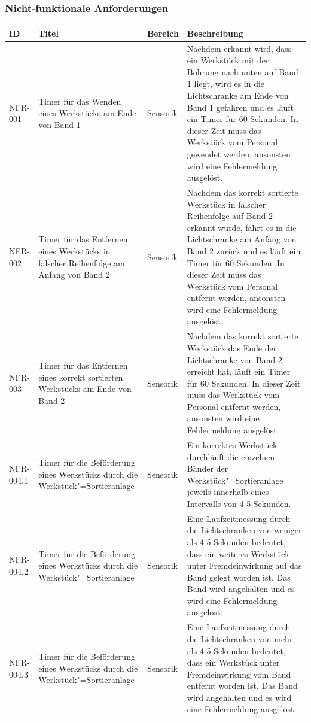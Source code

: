 \documentclass[oneside,a4paper,titlepage]{scrartcl} %
\begin{document}
\subsubsection{Nicht-funktionale Anforderungen}
\begin{small}
 \begin{longtable}{|p{2cm}|p{4cm}|p{1.5cm}|p{5.5cm}|}
  \hline
  \textbf{ID} & \textbf{Titel} & \textbf{Bereich} & \textbf{Beschreibung}\\
  \toprule
  \endhead
  \hline
  NFR-001 & Timer für das Wenden eines Werkstücks am Ende von Band 1 & Sensorik & Nachdem erkannt wird, dass ein Werkstück mit der Bohrung nach unten auf Band 1 liegt, wird es in die Lichtschranke am Ende von Band 1 gefahren und es läuft ein Timer für 60 Sekunden. In dieser Zeit muss das Werkstück vom Personal gewendet werden, ansonsten wird eine Fehlermeldung ausgelöst.\\
  \hline
  \rowcolor{lightgray} NFR-002 & Timer für das Entfernen eines Werkstücks in falscher Reihenfolge am Anfang von Band 2 & Sensorik & Nachdem das korrekt sortierte Werkstück in falscher Reihenfolge auf Band 2 erkannt wurde, fährt es in die Lichtschranke am Anfang von Band 2 zurück und es läuft ein Timer für 60 Sekunden. In dieser Zeit muss das Werkstück vom Personal entfernt werden, ansonsten wird eine Fehlermeldung ausgelöst.\\
  \hline
  NFR-003 & Timer für das Entfernen eines korrekt sortierten Werkstücks am Ende von Band 2 & Sensorik & Nachdem das korrekt sortierte Werkstück das Ende der Lichtschranke von Band 2 erreicht hat, läuft ein Timer für 60 Sekunden. In dieser Zeit muss das Werkstück vom Personal entfernt werden, ansonsten wird eine Fehlermeldung ausgelöst.\\
  \hline
  \rowcolor{lightgray} NFR-004.1 & Timer für die Beförderung eines Werkstücks durch die Werkstück"=Sortieranlage & Sensorik & Ein korrektes Werkstück durchläuft die einzelnen Bänder der Werkstück"=Sortieranlage jeweils innerhalb eines Intervalls von 4-5 Sekunden.\\
  \hline
  \rowcolor{lightgray} NFR-004.2 & Timer für die Beförderung eines Werkstücks durch die Werkstück"=Sortieranlage & Sensorik & Eine Laufzeitmessung durch die Lichtschranken von weniger als 4-5 Sekunden bedeutet, dass ein weiteres Werkstück unter Fremdeinwirkung auf das Band gelegt worden ist. Das Band wird angehalten und es wird eine Fehlermeldung ausgelöst.\\
  \hline
  \rowcolor{lightgray} NFR-004.3 & Timer für die Beförderung eines Werkstücks durch die Werkstück"=Sortieranlage & Sensorik & Eine Laufzeitmessung durch die Lichtschranken von mehr als 4-5 Sekunden bedeutet, dass ein Werkstück unter Fremdeinwirkung vom Band entfernt worden ist. Das Band wird angehalten und es wird eine Fehlermeldung ausgelöst.\\

\end{longtable}
\end{small}
\end{document}

